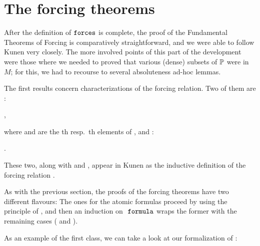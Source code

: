 \section{The forcing theorems}

After the definition of $\mathop{\mathtt{forces}}$ is complete, the proof of the
Fundamental Theorems of Forcing is comparatively straightforward, and
we were able to follow Kunen very closely. The more involved points of
this part of the development were those where we needed to proved that
various (dense) subsets of $\mathbb{P}$ were in $M$; for this, we had to
recourse to several absoluteness ad-hoc lemmas.

The first results concern characterizations of the forcing
relation. Two of them are :
\begin{center}
  ,
\end{center}
where  and  are the
th resp.\ th elements of , and  :
\begin{center}
  .
\end{center}
These two, along with   and
, appear in Kunen as the
inductive definition of the forcing relation \cite[Def.~IV.2.42]{kunen2011set}.

As with the previous section, the proofs of the forcing theorems have two different
flavours: The ones for the atomic formulas proceed by using the
principle of 
, and then an induction on
$\formula$ wraps the former with the remaining cases ( and ). 

As an example of the first class, we can take a look at our
formalization of \cite[Lem.~IV.2.40(a)]{kunen2011set}:


